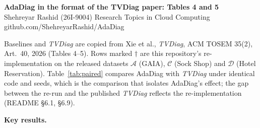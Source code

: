 \documentclass[10pt]{article}
\begin{document}
\begin{center}
{\large\textbf{AdaDiag in the format of the TVDiag paper: Tables 4 and 5}}\\[2pt]
{\small Shehreyar Rashid (26I-9004) \quad Research Topics in Cloud Computing \quad
github.com/ShehreyarRashid/AdaDiag}
\end{center}
\noindent\small Baselines and \textit{TVDiag} are copied from Xie et al., \textit{TVDiag}, ACM TOSEM
35(2), Art.~40, 2026 (Tables 4--5). Rows marked $\dagger$ are this repository's re-implementation on
the released datasets $\mathcal{A}$ (GAIA), $\mathcal{C}$ (Sock Shop) and $\mathcal{D}$ (Hotel
Reservation). Table~\ref{tab:paired} compares AdaDiag with \textit{TVDiag} under identical code and
seeds, which is the comparison that isolates AdaDiag's effect; the gap between the re-run and the
published \textit{TVDiag} reflects the re-implementation (README \S6.1, \S6.9).
\normalsize

\clearpage

\clearpage
\noindent\textbf{Key results.}
\end{document}

